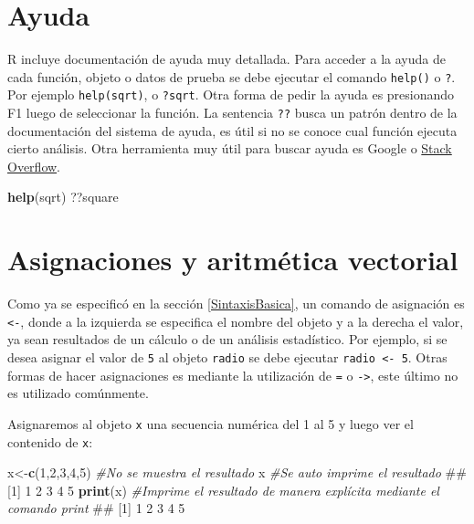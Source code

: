 \documentclass[]{book}
\newenvironment{Shaded}{\begin{snugshade}}{\end{snugshade}}
\newcommand{\KeywordTok}[1]{\textcolor[rgb]{0.13,0.29,0.53}{\textbf{#1}}}
\newcommand{\DecValTok}[1]{\textcolor[rgb]{0.00,0.00,0.81}{#1}}
\newcommand{\CommentTok}[1]{\textcolor[rgb]{0.56,0.35,0.01}{\textit{#1}}}
\newcommand{\NormalTok}[1]{#1}
\begin{document}
\section{Ayuda}\label{ayuda}

R incluye documentación de ayuda muy detallada. Para acceder a la ayuda
de cada función, objeto o datos de prueba se debe ejecutar el comando
\texttt{help()} o \texttt{?}. Por ejemplo \texttt{help(sqrt)}, o
\texttt{?sqrt}. Otra forma de pedir la ayuda es presionando F1 luego de
seleccionar la función. La sentencia \texttt{??} busca un patrón dentro
de la documentación del sistema de ayuda, es útil si no se conoce cual
función ejecuta cierto análisis. Otra herramienta muy útil para buscar
ayuda es Google o \href{https://stackoverflow.com/}{Stack Overflow}.

\begin{Shaded}
\begin{Highlighting}[]
\KeywordTok{help}\NormalTok{(sqrt)}
\NormalTok{??square}
\end{Highlighting}
\end{Shaded}

\section{Asignaciones y aritmética
vectorial}\label{asignaciones-y-aritmetica-vectorial}

Como ya se especificó en la sección \ref{SintaxisBasica}, un comando de
asignación es \texttt{\textless{}-}, donde a la izquierda se especifica
el nombre del objeto y a la derecha el valor, ya sean resultados de un
cálculo o de un análisis estadístico. Por ejemplo, si se desea asignar
el valor de \texttt{5} al objeto \texttt{radio} se debe ejecutar
\texttt{radio\ \textless{}-\ 5}. Otras formas de hacer asignaciones es
mediante la utilización de \texttt{=} o \texttt{-\textgreater{}}, este
último no es utilizado comúnmente.

Asignaremos al objeto \texttt{x} una secuencia numérica del 1 al 5 y
luego ver el contenido de \texttt{x}:

\begin{Shaded}
\begin{Highlighting}[]
\NormalTok{x<-}\KeywordTok{c}\NormalTok{(}\DecValTok{1}\NormalTok{,}\DecValTok{2}\NormalTok{,}\DecValTok{3}\NormalTok{,}\DecValTok{4}\NormalTok{,}\DecValTok{5}\NormalTok{)  }\CommentTok{#No se muestra el resultado}
\NormalTok{x                }\CommentTok{#Se auto imprime el resultado}
\NormalTok{## [1] 1 2 3 4 5}
\KeywordTok{print}\NormalTok{(x)         }\CommentTok{#Imprime el resultado de manera explícita mediante el comando print }
\NormalTok{## [1] 1 2 3 4 5}
\end{Highlighting}
\end{Shaded}
\end{document}
